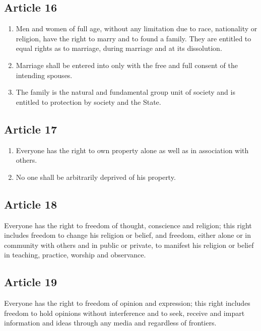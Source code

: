 \documentclass[
  ngerman,
  american,
  titlepage,
  openright,
  DIV=calc,
  toc=listof,
  listof=nochaptergap]{scrbook}
\begin{document}
\subsection{Article 16}\label{article-16-2}

\begin{enumerate}
\def\labelenumi{\arabic{enumi}.}
\item
  Men and women of full age, without any limitation due to race,
  nationality or religion, have the right to marry and to found a
  family. They are entitled to equal rights as to marriage, during
  marriage and at its dissolution.
\item
  Marriage shall be entered into only with the free and full consent of
  the intending spouses.
\item
  The family is the natural and fundamental group unit of society and is
  entitled to protection by society and the State.
\end{enumerate}

\subsection{Article 17}\label{article-17-2}

\begin{enumerate}
\def\labelenumi{\arabic{enumi}.}
\item
  Everyone has the right to own property alone as well as in association
  with others.
\item
  No one shall be arbitrarily deprived of his property.
\end{enumerate}

\subsection{Article 18}\label{article-18-2}

Everyone has the right to freedom of thought, conscience and religion;
this right includes freedom to change his religion or belief, and
freedom, either alone or in community with others and in public or
private, to manifest his religion or belief in teaching, practice,
worship and observance.

\subsection{Article 19}\label{article-19-2}

Everyone has the right to freedom of opinion and expression; this right
includes freedom to hold opinions without interference and to seek,
receive and impart information and ideas through any media and
regardless of frontiers.
\end{document}
